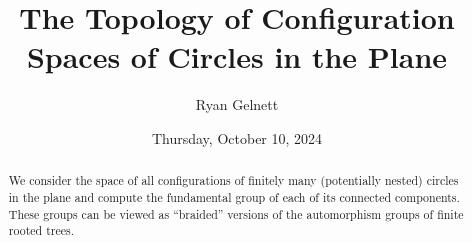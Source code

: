 \documentclass{UAmathtalk}
\author{Ryan Gelnett}
\title{The Topology of Configuration Spaces of Circles in the Plane}
\date{Thursday, October 10, 2024}
\begin{document}
\maketitle

\begin{abstract}
We consider the space of all configurations of finitely many (potentially nested) circles in the plane and compute the fundamental group of each of its connected components. These groups can be viewed as “braided” versions of the automorphism groups of finite rooted trees.
\end{abstract}
\end{document}
